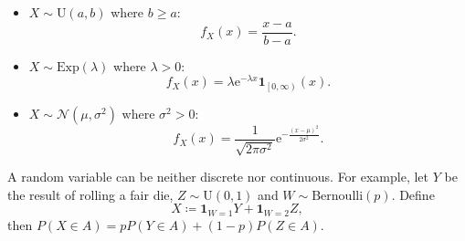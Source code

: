 \documentclass[math, code]{amznotes}
\theoremstyle{remark}
\newcommand{\e}{\mathrm{e}}
\begin{document}
\begin{itemize}
    \item $X \sim \mathrm{U}\left(a, b\right)$ where $b \geq a$:
    \begin{equation*}
        f_X\left(x\right) = \frac{x - a}{b - a}.
    \end{equation*}
    \item $X \sim \mathrm{Exp}\left(\lambda\right)$ where $\lambda > 0$:
    \begin{equation*}
        f_X\left(x\right) = \lambda \e^{-\lambda x}\mathbf{1}_{\left[0, \infty\right)}\left(x\right).
    \end{equation*}
    \item $X \sim \mathcal{N}\left(\mu, \sigma^2\right)$ where $\sigma^2 > 0$:
    \begin{equation*}
        f_X\left(x\right) = \frac{1}{\sqrt{2\pi\sigma^2}}\e^{-\frac{\left(x - \mu\right)^2}{2\sigma^2}}.
    \end{equation*}
\end{itemize}
A random variable can be neither discrete nor continuous. For example, let $Y$ be the result of rolling a fair die, $Z \sim \mathrm{U}\left(0, 1\right)$ and $W \sim \mathrm{Bernoulli}\left(p\right)$. Define 
\begin{equation*}
    X \coloneqq \mathbf{1}_{W = 1}Y + \mathbf{1}_{W = 2}Z,
\end{equation*}
then $P\left(X \in A\right) = pP\left(Y \in A\right) + \left(1 - p\right)P\left(Z \in A\right)$.
\end{document}
